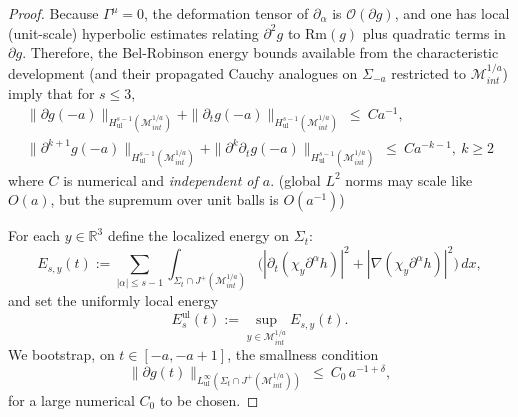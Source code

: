 \documentclass{amsart}
\begin{document}
{\begin{proof}
\smallskip
\noindent
Because $\Gamma^\mu=0$, the deformation tensor of $\partial_\alpha$ is $\mathcal{O}(\partial g)$, and
one has local (unit-scale) hyperbolic estimates relating $\partial^2 g$ to $\text{Rm}(g)$ plus quadratic terms
in $\partial g$. Therefore, the Bel-Robinson energy bounds available from the characteristic development
(and their propagated Cauchy analogues on $\Sigma_{-a}$ restricted to $\mathcal{M}^{1/a}_{int}$) imply that for 
$s\le 3$,
\begin{eqnarray}\label{eq:initHul}
\|\partial g(-a)\|_{H^{s-1}_{\mathrm{ul}}(\mathcal{M}^{1/a}_{int})}+\|\partial_t g(-a)\|_{H^{s-1}_{\mathrm{ul}}(\mathcal{M}^{1/a}_{int})}
\ \le\ Ca^{-1},\\
\|\partial^{k+1} g(-a)\|_{H^{s-1}_{\mathrm{ul}}(\mathcal{M}^{1/a}_{int})}+\|\partial^{k}\partial_t g(-a)\|_{H^{s-1}_{\mathrm{ul}}(\mathcal{M}^{1/a}_{int})}
\ \le\ Ca^{-k-1},~k\geq 2
\end{eqnarray}
where $C$ is numerical and \emph{independent of $a$}.
(global $L^2$ norms may scale like $O(a)$, but the supremum over unit balls is $O(a^{-1})$)

\noindent 
For each $y\in\mathbb R^3$ define the localized energy on $\Sigma_t$:
\[
E_{s,y}(t):=\sum_{|\alpha|\le s-1}\int_{\Sigma_t\cap J^{+}(\mathcal{M}^{1/a}_{int})}
\Big(|\partial_t(\chi_y\partial^\alpha h)|^2+|\nabla(\chi_y\partial^\alpha h)|^2\Big)\,dx,
\]
and set the uniformly local energy
\[
E_s^{\mathrm{ul}}(t):=\sup_{y\in\mathcal{M}^{1/a}_{int}} E_{s,y}(t).
\]
We bootstrap, on $t\in[-a,-a+1]$, the smallness condition
\begin{equation}\label{eq:bootSmall}
\|\partial g(t)\|_{L^\infty_{\mathrm{ul}}(\Sigma_t\cap J^{+}(\mathcal{M}^{1/a}_{int}))}\ \le\ C_0\,a^{-1+\delta},
\end{equation}
for a large numerical $C_0$ to be chosen.


\end{proof}}
\end{document}
